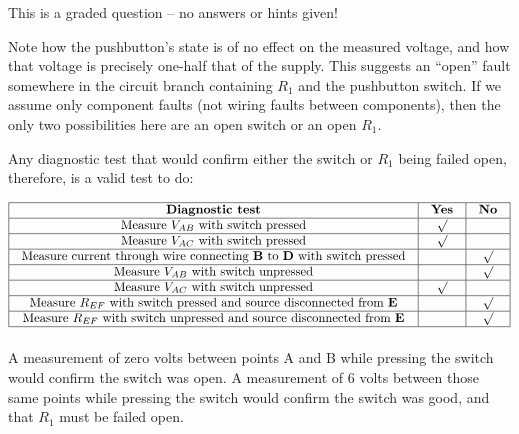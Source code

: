 \vfil 

\eject






This is a graded question -- no answers or hints given!







Note how the pushbutton's state is of no effect on the measured voltage, and how that voltage is precisely one-half that of the supply.  This suggests an ``open'' fault somewhere in the circuit branch containing $R_1$ and the pushbutton switch.  If we assume only component faults (not wiring faults between components), then the only two possibilities here are an open switch or an open $R_1$.

Any diagnostic test that would confirm either the switch or $R_1$ being failed open, therefore, is a valid test to do:


$$\vbox{\offinterlineskip
\halign{\strut
\vrule \quad\hfil # \ \hfil & 
\vrule \quad\hfil # \ \hfil & 
\vrule \quad\hfil # \ \hfil \vrule \cr
\noalign{\hrule}
%
{\bf Diagnostic test} & {\bf Yes} & {\bf No} \cr
%
\noalign{\hrule}
%
Measure $V_{AB}$ with switch pressed & $\surd$ &  \cr
%
\noalign{\hrule}
%
Measure $V_{AC}$ with switch pressed & $\surd$ &  \cr
%
\noalign{\hrule}
%
Measure current through wire connecting {\bf B} to {\bf D} with switch pressed &  & $\surd$ \cr
%
\noalign{\hrule}
%
Measure $V_{AB}$ with switch unpressed &  & $\surd$ \cr
%
\noalign{\hrule}
%
Measure $V_{AC}$ with switch unpressed & $\surd$ &  \cr
%
\noalign{\hrule}
%
Measure $R_{EF}$ with switch pressed and source disconnected from {\bf E} &  & $\surd$ \cr
%
\noalign{\hrule}
%
Measure $R_{EF}$ with switch unpressed and source disconnected from {\bf E} &  & $\surd$ \cr
%
\noalign{\hrule}
} %
}$$ %

\vskip 10pt

A measurement of zero volts between points A and B while pressing the switch would confirm the switch was open.  A measurement of 6 volts between those same points while pressing the switch would confirm the switch was good, and that $R_1$ must be failed open.

